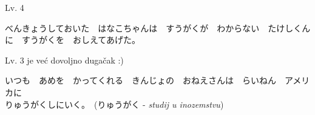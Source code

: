 	\begin{mondai}{Lv. 4}
		\item *べんきょうしておいた　はなこちゃんは　すうがくが　わからない　たけしくんに　すうがくを　おしえてあげた。
		\item Lv. 3 je već dovoljno dugačak :)
		\item いつも　あめを　かってくれる　きんじょの　おねえさんは　らいねん　アメリカに\\りゅうがくしにいく。　(りゅうがく - \textit{studij u inozemstvu})
	\end{mondai}

